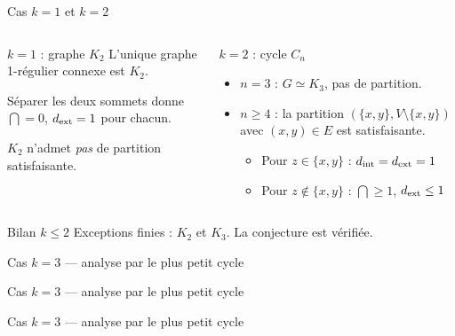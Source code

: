 \begin{frame}{Cas $k = 1$ et $k = 2$}
  \begin{columns}[T]
    \begin{block}{$k = 1$ : graphe $K_2$}
      L'unique graphe 1-r\'egulier connexe est $K_2$.
      \medskip

      S\'eparer les deux sommets donne $\dint = 0$, $d_{\mathrm{ext}} = 1$ pour chacun.

      \medskip
      \alert{$K_2$ n'admet \emph{pas} de partition satisfaisante.}
    \end{block}

    \begin{block}{$k = 2$ : cycle $C_n$}
      \begin{itemize}
        \item $n = 3$ : $G \simeq K_3$, \alert{pas de partition}.
        \item $n \geq 4$ : la partition $(\{x,y\}, V \setminus \{x,y\})$ avec $(x,y) \in E$ est satisfaisante.
          \begin{itemize}
            \item Pour $z \in \{x,y\}$ : $d_{\mathrm{int}} = d_{\mathrm{ext}} = 1$ \checkmark
            \item Pour $z \notin \{x,y\}$ : $\dint \geq 1$, $d_{\mathrm{ext}} \leq 1$ \checkmark
          \end{itemize}
      \end{itemize}
    \end{block}
  \end{columns}

  \bigskip
  \begin{exampleblock}{Bilan $k \leq 2$}
    Exceptions finies : $K_2$ et $K_3$. La conjecture est v\'erifi\'ee.
  \end{exampleblock}
\end{frame}

\begin{frame}{Cas $k = 3$ --- analyse par le plus petit cycle}
  \,%
\end{frame}

\begin{frame}{Cas $k = 3$ --- analyse par le plus petit cycle}
  
\end{frame}

\begin{frame}{Cas $k = 3$ --- analyse par le plus petit cycle}
  
\end{frame}

